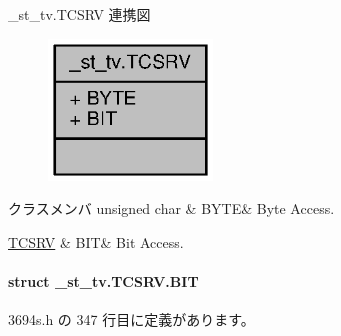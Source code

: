 \+\_\+st\+\_\+tv.\+T\+C\+S\+R\+V 連携図
\nopagebreak
\begin{figure}[H]
\begin{center}
\leavevmode
\includegraphics[width=124pt]{d1/de3/union__st__tv_8TCSRV__coll__graph}
\end{center}
\end{figure}
\begin{DoxyFields}{クラスメンバ}
unsigned char\label{3694s_8h_ae409eb2ba6eb6801f52763ae370c350e}
&
B\+Y\+T\+E&
Byte Access. \\
\hline

\hyperlink{3694s_8h_da/d61/struct__st__tv_8TCSRV_8BIT}{T\+C\+S\+R\+V}\label{3694s_8h_adb957fdc8000e1eef04a243f5199aa52}
&
B\+I\+T&
Bit Access. \\
\hline

\end{DoxyFields}
\label{struct__st__tv_8TCSRV_8BIT}
\paragraph{struct \+\_\+st\+\_\+tv.\+T\+C\+S\+R\+V.\+B\+I\+T}


 3694s.\+h の 347 行目に定義があります。



